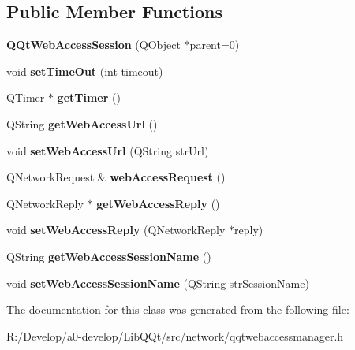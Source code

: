 \subsection*{Public Member Functions}
\begin{DoxyCompactItemize}
\item 
\mbox{\label{class_q_qt_web_access_session_a47d2e359e97aef7e07c847115aaea42e}} 
{\bfseries Q\+Qt\+Web\+Access\+Session} (Q\+Object $\ast$parent=0)
\item 
\mbox{\label{class_q_qt_web_access_session_a0668bae2f4bb27effba5ef638bf2b2ab}} 
void {\bfseries set\+Time\+Out} (int timeout)
\item 
\mbox{\label{class_q_qt_web_access_session_a3d07f90c2f5d70911411d25774020af2}} 
Q\+Timer $\ast$ {\bfseries get\+Timer} ()
\item 
\mbox{\label{class_q_qt_web_access_session_afe067f24b167466ecb2d3b33c4a549e2}} 
Q\+String {\bfseries get\+Web\+Access\+Url} ()
\item 
\mbox{\label{class_q_qt_web_access_session_a3601fa7f3dfd0ae6a9830c1ff47dd6b9}} 
void {\bfseries set\+Web\+Access\+Url} (Q\+String str\+Url)
\item 
\mbox{\label{class_q_qt_web_access_session_a191c16e606a4fea44989435b80ea9b7c}} 
Q\+Network\+Request \& {\bfseries web\+Access\+Request} ()
\item 
\mbox{\label{class_q_qt_web_access_session_af4faec0383e1597ff9b2077066735056}} 
Q\+Network\+Reply $\ast$ {\bfseries get\+Web\+Access\+Reply} ()
\item 
\mbox{\label{class_q_qt_web_access_session_a4fca92f0da054f709ec8d77f37705fd1}} 
void {\bfseries set\+Web\+Access\+Reply} (Q\+Network\+Reply $\ast$reply)
\item 
\mbox{\label{class_q_qt_web_access_session_af77e33e7dda1fc7b1086a4d6ca49e5fe}} 
Q\+String {\bfseries get\+Web\+Access\+Session\+Name} ()
\item 
\mbox{\label{class_q_qt_web_access_session_af81a963e2ab5cdf120f6fbe60ea4003f}} 
void {\bfseries set\+Web\+Access\+Session\+Name} (Q\+String str\+Session\+Name)
\end{DoxyCompactItemize}


The documentation for this class was generated from the following file\+:\begin{DoxyCompactItemize}
\item 
R\+:/\+Develop/a0-\/develop/\+Lib\+Q\+Qt/src/network/qqtwebaccessmanager.\+h\end{DoxyCompactItemize}
